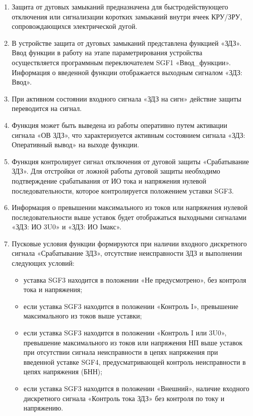 
\color{black}

\begin{enumerate}

\item
Защита от дуговых замыканий предназначена для быстродействующего отключения или сигнализации коротких замыканий внутри ячеек КРУ/ЗРУ, сопровождающихся электрической дугой.

\item 
В устройстве защита от дуговых замыканий представлена функцией «ЗДЗ». Ввод функции в работу на этапе параметрирования устройства осуществляется программным переключателем SGF1 «Ввод\_функции». Информация о введенной функции отображается выходным сигналом «ЗДЗ: Ввод».

\item
При активном состоянии входного сигнала «ЗДЗ на сигн» действие защиты переводится на сигнал.

\item
Функция может быть выведена из работы оперативно путем активации сигнала «ОВ ЗДЗ», что характеризуется активным состоянием сигнала «ЗДЗ: Оперативный вывод» на выходе функции.

\item
Функция контролирует сигнал отключения от дуговой защиты «Срабатывание ЗДЗ». Для отстройки от ложной работы дуговой защиты необходимо подтверждение срабатывания от ИО тока и напряжения нулевой последовательности, которое контролируется положением уставки SGF3.

\item
Информация о превышении максимального из токов или напряжения нулевой последовательности выше уставок будет отображаться выходными сигналами «ЗДЗ: ИО 3U0» и «ЗДЗ: ИО Iмакс».

\item
Пусковые условия функции формируются при наличии входного дискретного сигнала «Срабатывание ЗДЗ», отсутствие неисправности ЗДЗ и выполнении следующих условий:
\begin{itemize}
    \item уставка SGF3 находится в положении «Не предусмотрено», без контроля тока и напряжения;
    \item если уставка SGF3 находится в положении «Контроль I», превышение максимального из токов выше уставки;
    \item если уставка SGF3 находится в положении «Контроль I или 3U0», превышение максимального из токов или напряжения НП выше уставок при отсутствии сигнала неисправности в цепях напряжения при введенной уставке SGF4,  предусматривающей контроль неисправности в цепях напряжения (БНН);
    \item если уставка SGF3 находится в положении «Внешний», наличие входного дискретного сигнала «Контроль тока ЗДЗ» без контроля по току и напряжению.
\end{itemize}


\end{enumerate}
